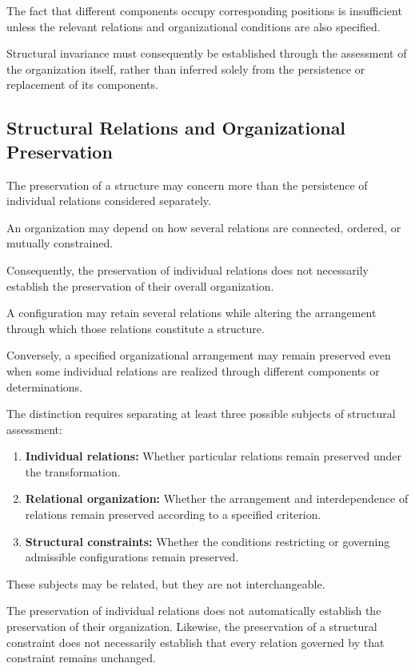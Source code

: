The fact that different components occupy
corresponding positions is insufficient unless
the relevant relations and organizational
conditions are also specified.

Structural invariance must consequently be
established through the assessment of the
organization itself, rather than inferred
solely from the persistence or replacement
of its components.

\subsection{Structural Relations and Organizational Preservation}

The preservation of a structure may concern
more than the persistence of individual
relations considered separately.

An organization may depend on how several
relations are connected, ordered, or mutually
constrained.

Consequently, the preservation of individual
relations does not necessarily establish
the preservation of their overall organization.

A configuration may retain several relations
while altering the arrangement through which
those relations constitute a structure.

Conversely, a specified organizational
arrangement may remain preserved even when
some individual relations are realized through
different components or determinations.

The distinction requires separating at least
three possible subjects of structural assessment:

\begin{enumerate}
    \item \textbf{Individual relations:}
    Whether particular relations remain preserved
    under the transformation.

    \item \textbf{Relational organization:}
    Whether the arrangement and interdependence
    of relations remain preserved according
    to a specified criterion.

    \item \textbf{Structural constraints:}
    Whether the conditions restricting or
    governing admissible configurations remain
    preserved.
\end{enumerate}

These subjects may be related, but they are
not interchangeable.

The preservation of individual relations
does not automatically establish the
preservation of their organization. Likewise,
the preservation of a structural constraint
does not necessarily establish that every
relation governed by that constraint remains
unchanged.


